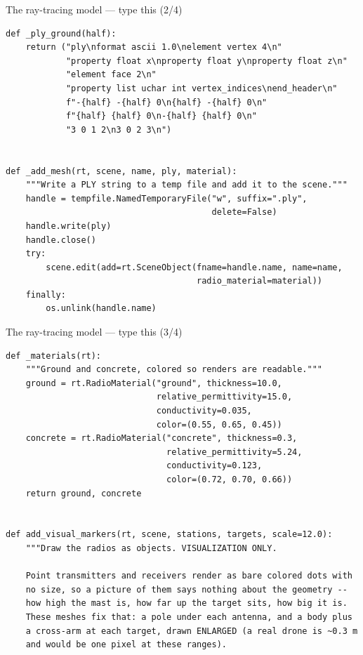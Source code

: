 \documentclass[10pt]{beamer}
\begin{document}
\begin{frame}[fragile]{The ray-tracing model --- type this (2/4)}
\begin{lstlisting}[basicstyle=\ttfamily\tiny]
def _ply_ground(half):
    return ("ply\nformat ascii 1.0\nelement vertex 4\n"
            "property float x\nproperty float y\nproperty float z\n"
            "element face 2\n"
            "property list uchar int vertex_indices\nend_header\n"
            f"-{half} -{half} 0\n{half} -{half} 0\n"
            f"{half} {half} 0\n-{half} {half} 0\n"
            "3 0 1 2\n3 0 2 3\n")


def _add_mesh(rt, scene, name, ply, material):
    """Write a PLY string to a temp file and add it to the scene."""
    handle = tempfile.NamedTemporaryFile("w", suffix=".ply",
                                         delete=False)
    handle.write(ply)
    handle.close()
    try:
        scene.edit(add=rt.SceneObject(fname=handle.name, name=name,
                                      radio_material=material))
    finally:
        os.unlink(handle.name)

\end{lstlisting}
\end{frame}

\begin{frame}[fragile]{The ray-tracing model --- type this (3/4)}
\begin{lstlisting}[basicstyle=\ttfamily\tiny]
def _materials(rt):
    """Ground and concrete, colored so renders are readable."""
    ground = rt.RadioMaterial("ground", thickness=10.0,
                              relative_permittivity=15.0,
                              conductivity=0.035,
                              color=(0.55, 0.65, 0.45))
    concrete = rt.RadioMaterial("concrete", thickness=0.3,
                                relative_permittivity=5.24,
                                conductivity=0.123,
                                color=(0.72, 0.70, 0.66))
    return ground, concrete


def add_visual_markers(rt, scene, stations, targets, scale=12.0):
    """Draw the radios as objects. VISUALIZATION ONLY.

    Point transmitters and receivers render as bare colored dots with
    no size, so a picture of them says nothing about the geometry --
    how high the mast is, how far up the target sits, how big it is.
    These meshes fix that: a pole under each antenna, and a body plus
    a cross-arm at each target, drawn ENLARGED (a real drone is ~0.3 m
    and would be one pixel at these ranges).
\end{lstlisting}
\end{frame}
\end{document}
